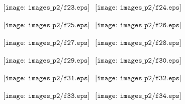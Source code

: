 \documentclass[a4paper,10pt]{article}
\begin{document}
\begin{figure}[h]
\begin{center}$
\begin{array}{cc}
\texttt{[image: images\_p2/f23.eps]} &
\texttt{[image: images\_p2/f24.eps]}
\end{array}$
\end{center}
\end{figure}

\begin{figure}[h]
\begin{center}$
\begin{array}{cc}
\texttt{[image: images\_p2/f25.eps]} &
\texttt{[image: images\_p2/f26.eps]}
\end{array}$
\end{center}
\end{figure}

\begin{figure}[h]
\begin{center}$
\begin{array}{cc}
\texttt{[image: images\_p2/f27.eps]} &
\texttt{[image: images\_p2/f28.eps]}
\end{array}$
\end{center}
\end{figure}

\begin{figure}[h]
\begin{center}$
\begin{array}{cc}
\texttt{[image: images\_p2/f29.eps]} &
\texttt{[image: images\_p2/f30.eps]}
\end{array}$
\end{center}
\end{figure}

\begin{figure}[h]
\begin{center}$
\begin{array}{cc}
\texttt{[image: images\_p2/f31.eps]} &
\texttt{[image: images\_p2/f32.eps]}
\end{array}$
\end{center}
\end{figure}

\begin{figure}[h]
\begin{center}$
\begin{array}{cc}
\texttt{[image: images\_p2/f33.eps]} &
\texttt{[image: images\_p2/f34.eps]}
\end{array}$
\end{center}
\end{figure}
\end{document}
